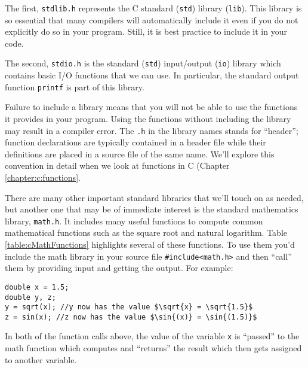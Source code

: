 The first, \texttt{stdlib.h} represents the C standard (\texttt{std}) 
library (\texttt{lib}).  This library is
so essential that many compilers will automatically include it even if you do not
explicitly do so in your program.  Still, it is best practice to include it in your code.

The second, \texttt{stdio.h} is the standard (\texttt{std}) input/output 
(\texttt{io}) library which contains basic I/O functions that we can use.  
In particular, the standard output function \texttt{printf} is part of this library.

Failure to include a library means that you will not be able to use the functions
it provides in your program.  Using the functions without including the library may
result in a compiler error.  The \texttt{.h} in the library names stands for 
``header''; function declarations are typically contained in a header file while 
their definitions are placed in a source file of the same name.  We'll explore
this convention in detail when we look at functions in C (Chapter \ref{chapter:c:functions}.

There are many other important standard libraries that we'll touch on as 
needed, but another one that may be of immediate interest is the standard
mathematics library, \texttt{math.h}.  It includes many useful functions
to compute common mathematical functions such as the square root and 
natural logarithm.  Table \ref{table:cMathFunctions} highlights several of 
these functions.  To use them you'd include the math library in your source
file \texttt{#include<math.h>} and then ``call'' them by providing input 
and getting the output.  For example:

\begin{verbatim}
double x = 1.5;
double y, z;
y = sqrt(x); //y now has the value $\sqrt{x} = \sqrt{1.5}$
z = sin(x); //z now has the value $\sin{(x)} = \sin{(1.5)}$
\end{verbatim}

In both of the function calls above, the value of the variable \texttt{x} is
``passed'' to the math function which computes and ``returns'' the
result which then gets assigned to another variable.

